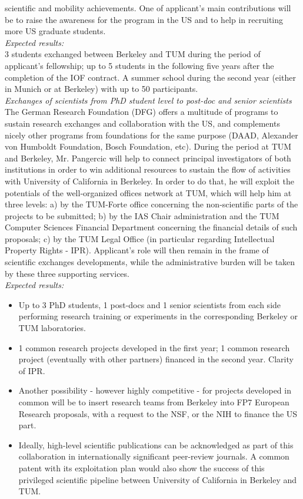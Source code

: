 scientific  and mobility  achievements. One  of applicant's  main contributions
will be to raise  the awareness for the program in the  US and to help
in recruiting more US graduate students.\\
\emph{Expected results:}\\
 3 students exchanged between Berkeley and TUM during
the period of  applicant's fellowship; up to 5 students  in the following five
years after the completion of the IOF contract. A summer school during
the  second year  (either in  Munich or at Berkeley)  with up  to 50
participants. \\  
\emph{Exchanges of  scientists from  PhD student  level to
post-doc and  senior scientists}\\
 The German Research  Foundation (DFG) offers  a multitude  of  programs to  sustain  research exchanges  and
collaboration with the US,  and complements nicely other programs from
foundations  for  the  same  purpose  (DAAD,  Alexander  von  Humboldt
Foundation, Bosch Foundation, etc). During  the period at TUM and Berkeley, 
Mr. Pangercic will help to connect principal  investigators of both institutions in order
to win  additional resources  to sustain the  flow of  activities with
University  of California in  Berkeley. In  order to  do that,  he will
exploit the  potentials of  the well-organized offices  network at
TUM, which  will help him at  three levels: a) by  the TUM-Forte office
concerning the  non-scientific parts of the projects  to be submitted;
b)  by the  IAS Chair  administration and  the TUM  Computer Sciences
Financial  Department   concerning  the  financial   details  of  such
proposals;  c)  by  the  TUM  Legal Office  (in  particular  regarding
Intellectual Property Rights  - IPR). Applicant's role will  then remain in the
frame of  scientific exchanges developments,  while the administrative
burden  will be taken  by these  three supporting  services.\\
\emph{Expected results:}\\
\begin{itemize}
\item Up  to 3  PhD students, 1  post-docs and 1  senior scientists
from  each side  performing research  training or  experiments  in the
corresponding   Berkeley   or   TUM laboratories.  
\item 1 common research projects developed in the first year;
1 common research project (eventually with other partners) financed in
the second year. Clarity of IPR.  
\item Another possibility - however highly competitive  - for  projects developed
in  common will  be to  insert research  teams from  Berkeley  into FP7
European Research proposals, with a request  to the NSF, or the NIH to
finance the US part.   
\item Ideally, high-level scientific publications can
be  acknowledged  as part  of  this  collaboration in  internationally
significant   peer-review   journals.  A   common   patent  with   its
exploitation  plan would  also  show the  success  of this  privileged
scientific pipeline  between University of California  in Berkeley and
TUM.
\end{itemize}

